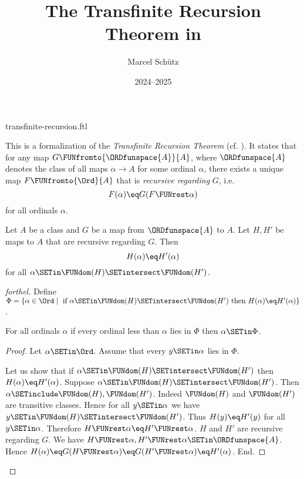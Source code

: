 \documentclass{article}
\title{The Transfinite Recursion Theorem in \Naproche}
\author{Marcel Schütz}
\date{2024--2025}
\begin{document}
\begin{smodule}{transfinite-recursion.ftl}
\maketitle


\noindent This is a formalization of the \emph{Transfinite Recursion Theorem}
(cf. \cite{Koepke2018}).
It states that for any map $G \FUNfromto{\ORDfunspace{A}}{A}$, where
$\ORDfunspace{A}$ denotes the class of all maps $\alpha \to A$ for some
ordinal $\alpha$, there exists a unique map $F \FUNfromto{\Ord}{A}$ that is
\emph{recursive regarding} $G$, i.e. \[F(\alpha) \eq G(F \FUNrest \alpha)\] for
all ordinals $\alpha$.

\begin{lemma}[forthel,title=Coincidence Lemma,id=transfinite_recursion_coincidence]
  Let $A$ be a class and $G$ be a map from $\ORDfunspace{A}$ to $A$.
  Let $H, H'$ be maps to $A$ that are recursive regarding $G$.
  Then \[ H(\alpha) \eq H'(\alpha) \] for all $\alpha \SETin \FUNdom(H) \SETintersect \FUNdom(H')$.
\end{lemma}
\begin{proof}[forthel]
  Define $\Phi = \{ \alpha \in \Ord \mid\text{ if }
  \alpha \SETin \FUNdom(H) \SETintersect \FUNdom(H')\text{ then }H(\alpha) \eq H'(\alpha) \}$.

  For all ordinals $\alpha$ if every ordinal less than $\alpha$ lies in $\Phi$ then $\alpha \SETin \Phi$.
  \begin{proof}
    Let $\alpha \SETin \Ord$.
    Assume that every $y \SETin \alpha$ lies in $\Phi$.

    Let us show that if $\alpha \SETin \FUNdom(H) \SETintersect \FUNdom(H')$ then
    $H(\alpha) \eq H'(\alpha)$.
      Suppose $\alpha \SETin \FUNdom(H) \SETintersect \FUNdom(H')$.
      Then $\alpha \SETinclude \FUNdom(H), \FUNdom(H')$.
      Indeed $\FUNdom(H)$ and $\FUNdom(H')$ are transitive classes.
      Hence for all $y \SETin \alpha$ we have $y \SETin \FUNdom(H) \SETintersect \FUNdom(H')$.
      Thus $H(y) \eq H'(y)$ for all $y \SETin \alpha$.
      Therefore $H \FUNrest \alpha \eq H' \FUNrest \alpha$.
      $H$ and $H'$ are recursive regarding $G$.
      We have $H \FUNrest \alpha, H' \FUNrest \alpha \SETin \ORDfunspace{A}$.
      Hence $H(\alpha)
        \eq G(H \FUNrest \alpha)
        \eq G(H' \FUNrest \alpha)
        \eq H'(\alpha)$.
    End.


\end{proof}
\end{proof}
\end{smodule}
\end{document}
